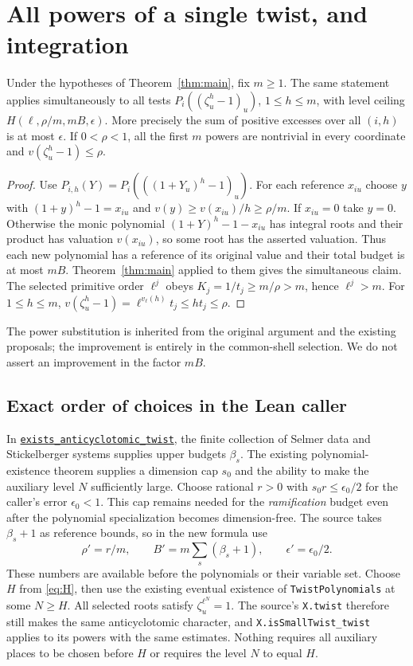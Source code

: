 \documentclass[11pt]{article}
\newcommand{\src}[3]{\href{https://github.com/VladimirReshetnikov/ProveIt/blob/ef7d441dcb37ea944b7ac15731bb766f2e1354ea/Analysis/GeneralizedRiemannHypothesis/Lean/grh/src/#1.lean\#L#2}{#3}}
\begin{document}
\section{All powers of a single twist, and integration}\label{sec:integration}
\begin{corollary}\label{cor:powers}
Under the hypotheses of Theorem~\ref{thm:main}, fix $m\ge1$. The same statement applies simultaneously to all tests $P_i((\zeta_u^h-1)_u)$, $1\le h\le m$, with level ceiling $H(\ell,\rho/m,mB,\epsilon)$. More precisely the sum of positive excesses over all $(i,h)$ is at most $\epsilon$. If $0<\rho<1$, all the first $m$ powers are nontrivial in every coordinate and $v(\zeta_u^h-1)\le\rho$.
\end{corollary}
\begin{proof}
Use $P_{i,h}(Y)=P_i(((1+Y_u)^h-1)_u)$. For each reference $x_{iu}$ choose $y$ with $(1+y)^h-1=x_{iu}$ and $v(y)\ge v(x_{iu})/h\ge\rho/m$. If $x_{iu}=0$ take $y=0$. Otherwise the monic polynomial $(1+Y)^h-1-x_{iu}$ has integral roots and their product has valuation $v(x_{iu})$, so some root has the asserted valuation. Thus each new polynomial has a reference of its original value and their total budget is at most $mB$. Theorem~\ref{thm:main} applied to them gives the simultaneous claim. The selected primitive order $\ell^j$ obeys $K_j=1/t_j\ge m/\rho>m$, hence $\ell^j>m$. For $1\le h\le m$, $v(\zeta_u^h-1)=\ell^{v_\ell(h)}t_j\le ht_j\le\rho$.
\end{proof}
The power substitution is inherited from the original argument and the existing proposals; the improvement is entirely in the common-shell selection. We do not assert an improvement in the factor $mB$.

\subsection*{Exact order of choices in the Lean caller}
In \src{New/Congruences/Selmer/GeneralTheorem}{392}{\texttt{exists\_anticyclotomic\_twist}}, the finite collection of Selmer data and Stickelberger systems supplies upper budgets $\beta_s$. The existing polynomial-existence theorem supplies a dimension cap $s_0$ and the ability to make the auxiliary level $N$ sufficiently large. Choose rational $r>0$ with $s_0r\le\epsilon_0/2$ for the caller's error $\epsilon_0<1$. This cap remains needed for the \emph{ramification} budget even after the polynomial specialization becomes dimension-free. The source takes $\beta_s+1$ as reference bounds, so in the new formula use
\[
 \rho'=r/m,\qquad B'=m\sum_s(\beta_s+1),\qquad \epsilon'=\epsilon_0/2.
\]
These numbers are available before the polynomials or their variable set. Choose $H$ from \eqref{eq:H}, then use the existing eventual existence of \texttt{TwistPolynomials} at some $N\ge H$. All selected roots satisfy $\zeta_u^{\ell^N}=1$. The source's \texttt{X.twist} therefore still makes the same anticyclotomic character, and \texttt{X.isSmallTwist\_twist} applies to its powers with the same estimates. Nothing requires all auxiliary places to be chosen before $H$ or requires the level $N$ to equal $H$.
\end{document}
